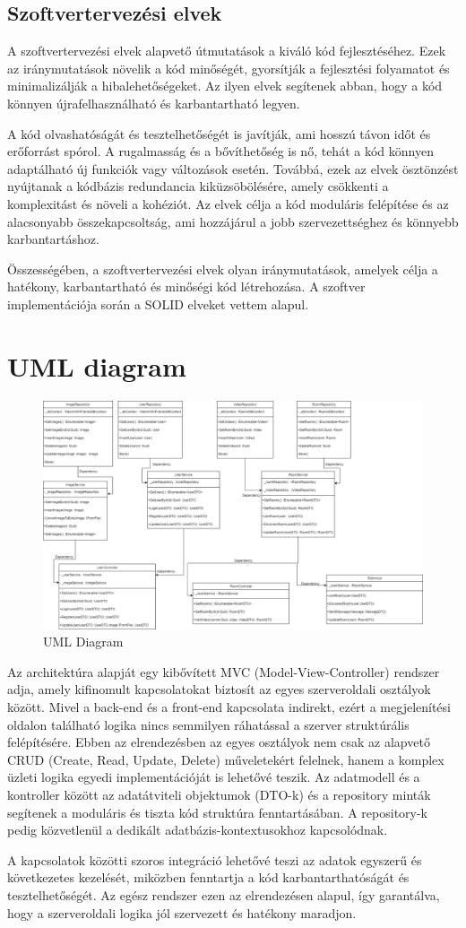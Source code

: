 \subsection{Szoftvertervezési elvek}
A szoftvertervezési elvek alapvető útmutatások a kiváló kód fejlesztéséhez. Ezek az iránymutatások növelik a kód minőségét, gyorsítják a fejlesztési folyamatot és minimalizálják a hibalehetőségeket. Az ilyen elvek segítenek abban, hogy a kód könnyen újrafelhasználható és karbantartható legyen.

A kód olvashatóságát és tesztelhetőségét is javítják, ami hosszú távon időt és erőforrást spórol. A rugalmasság és a bővíthetőség is nő, tehát a kód könnyen adaptálható új funkciók vagy változások esetén. Továbbá, ezek az elvek ösztönzést nyújtanak a kódbázis redundancia kiküzsöbölésére, amely csökkenti a komplexitást és növeli a kohéziót. Az elvek célja a kód moduláris felépítése és az alacsonyabb összekapcsoltság, ami hozzájárul a jobb szervezettséghez és könnyebb karbantartáshoz.

Összességében, a szoftvertervezési elvek olyan iránymutatások, amelyek célja a hatékony, karbantartható és minőségi kód létrehozása.
A szoftver implementációja során a SOLID elveket vettem alapul.

\section{UML diagram}

\begin{figure}[H]
    \centering
    \includegraphics[width=14.0truecm]{images/UML_Diagram.png}
    \caption{UML Diagram}
    \label{fig:uml_diagram}
\end{figure}

Az architektúra alapját egy kibővített MVC (Model-View-Controller) rendszer adja,
amely kifinomult kapcsolatokat biztosít az egyes szerveroldali osztályok között. Mivel a back-end és a front-end kapcsolata indirekt, ezért a megjelenítési oldalon található logika nincs semmilyen ráhatással a szerver struktúrális felépítésére.
Ebben az elrendezésben az egyes osztályok nem csak az alapvető CRUD (Create, Read, Update, Delete) műveletekért felelnek, hanem a komplex üzleti logika egyedi implementációját is lehetővé teszik. Az adatmodell és a kontroller között az adatátviteli objektumok (DTO-k) és a repository minták segítenek a moduláris és tiszta kód struktúra fenntartásában. A repository-k pedig közvetlenül a dedikált adatbázis-kontextusokhoz kapcsolódnak.

A kapcsolatok közötti szoros integráció lehetővé teszi az adatok egyszerű és következetes kezelését, miközben fenntartja a kód karbantarthatóságát és tesztelhetőségét. Az egész rendszer ezen az elrendezésen alapul, így garantálva, hogy a szerveroldali logika
jól szervezett és hatékony maradjon.
